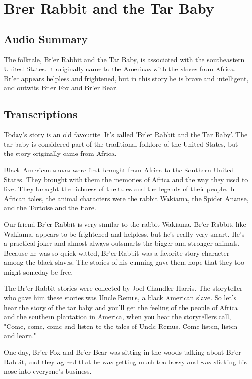 \section{Brer Rabbit and the Tar Baby}

\subsection{Audio Summary}

The folktale, Br'er Rabbit and the Tar Baby, is associated with the southeastern United States.
It originally came to the Americas with the slaves from Africa.
Br'er appears helpless and frightened, but in this story he is brave and intelligent, and outwits Br'er Fox and Br'er Bear.

\subsection{Transcriptions}

Today's story is an old favourite. It's called 'Br'er Rabbit and the Tar Baby'. The tar baby is considered part of the traditional folklore of the United States, but the story originally came from Africa.

Black American slaves were first brought from Africa to the Southern United States. They brought with them the memories of Africa and the way they used to live. They brought the richness of the tales and the legends of their people. In African tales, the animal characters were the rabbit Wakiama, the Spider Ananse, and the Tortoise and the Hare.

Our friend Br'er Rabbit is very similar to the rabbit Wakiama. Br'er Rabbit, like Wakiama, appears to be frightened and helpless, but he's really very smart. He's a practical joker and almost always outsmarts the bigger and stronger animals. Because he was so quick-witted, Br'er Rabbit was a favorite story character among the black slaves. The stories of his cunning gave them hope that they too might someday be free.

The Br'er Rabbit stories were collected by Joel Chandler Harris. The storyteller who gave him these stories was Uncle Remus, a black American slave. So let's hear the story of the tar baby and you'll get the feeling of the people of Africa and the southern plantation in America, when you hear the storytellers call, "Come, come, come and listen to the tales of Uncle Remus. Come listen, listen and learn."

One day, Br'er Fox and Br'er Bear was sitting in the woods talking about Br'er Rabbit, and they agreed that he was getting much too bossy and was sticking his nose into everyone's business.

